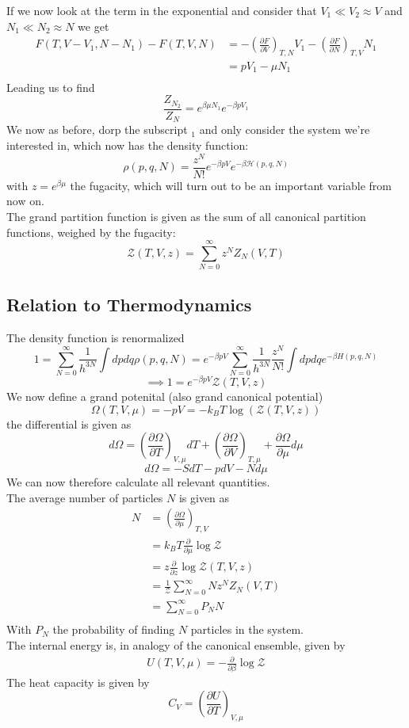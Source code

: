\documentclass{report}
\begin{document}
If we now look at the term in the exponential and consider that $V_1 \ll V_2 \approx V$ and $N_1 \ll N_2 \approx N$ we get 
\begin{align*}
  F\left( T, V-V_1, N - N_1 \right) - F\left( T,V,N \right) &= -\left( \frac{\partial F}{\partial V} \right) _{T,N} V_1 -\left( \frac{\partial F}{\partial N} \right) _{T,V} N_1 \\
  &= p V_1 - \mu N_1 \\
\end{align*}
Leading us to find \[
\frac{Z_{N_2}}{Z_N} = e^{\beta \mu N_1} e^{-\beta p V_1}
\] 
We now as before, dorp the subscript $_1$ and only consider the system we're interested in, which now has the density function: \[
  \rho\left( p,q,N \right) = \frac{z^N}{N!} e^{-\beta pV} e^{-\beta \mathcal{H}\left( p,q,N \right) }
\] 
with $z = e^{\beta \mu}$ the fugacity, which will turn out to be an important variable from now on.\\
The grand partition function is given as the sum of all canonical partition functions, weighed by the fugacity:
\[
  \mathcal{Z}\left( T,V,z \right) = \sum_{N=0}^{\infty} z^{N} Z_N\left( V, T \right) 
\] 
\subsection{Relation to Thermodynamics}
The density function is renormalized \[
  1 = \sum_{N=0}^{\infty} \frac{1}{h^{3N}} \int dp dq \rho\left( p,q,N \right) = e^{-\beta pV} \sum_{N=0}^{\infty} \frac{1}{h^{3N}} \frac{z^N}{N!} \int dp dq e^{-\beta H\left( p,q,N \right) }
\] \[
\implies 1 = e^{-\beta pV} \mathcal{Z}\left( T,V,z \right) 
\] 
We now define a grand potenital (also grand canonical potential) \[
  \Omega\left( T,V,\mu \right) = -pV = -k_B T \log\left( \mathcal{Z}\left( T,V,z \right)  \right) 
\] the differential is given as \[
d\Omega = \left( \frac{\partial \Omega}{\partial T} \right) _{V, \mu} dT + \left( \frac{\partial \Omega}{\partial V} \right) _{T,  \mu} + \frac{\partial \Omega}{\partial \mu} d\mu 
\] \[
d\Omega = -S dT - p dV - N d \mu
\] 
We can now therefore calculate all relevant quantities.\\
The average number of particles $N$ is given as
\begin{align*}
  N &= \left( \frac{\partial \Omega}{\partial \mu } \right) _{T, V} \\
    &= k_B T \frac{\partial }{\partial \mu} \log \mathcal{Z} \\
    &= z \frac{\partial }{\partial z} \log \mathcal{Z}\left( T,V,z \right)  \\
    &= \frac{1}{\mathcal{Z}} \sum_{N=0}^{\infty} N z^N Z_N\left( V,T \right)  \\
    &= \sum_{N=0}^{\infty} P_N N \\
\end{align*}
With $P_N$ the probability of finding $N$ particles in the system. \\
The internal energy is, in analogy of the canonical ensemble, given by
\begin{align*}
  U\left( T,V,\mu \right) = - \frac{\partial }{\partial \beta} \log \mathcal{Z}
\end{align*}
The heat capacity is given by \[
  C_V = \left( \frac{\partial U}{\partial T} \right)_{V, \mu}
\] 
\end{document}
